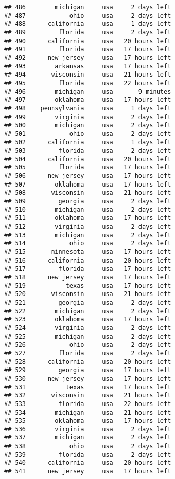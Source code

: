 \documentclass[
]{article}
\begin{document}
\begin{verbatim}
## 486        michigan     usa     2 days left
## 487            ohio     usa     2 days left
## 488      california     usa     1 days left
## 489         florida     usa     2 days left
## 490      california     usa   20 hours left
## 491         florida     usa   17 hours left
## 492      new jersey     usa   17 hours left
## 493        arkansas     usa   17 hours left
## 494       wisconsin     usa   21 hours left
## 495         florida     usa   22 hours left
## 496        michigan     usa       9 minutes
## 497        oklahoma     usa   17 hours left
## 498    pennsylvania     usa     1 days left
## 499        virginia     usa     2 days left
## 500        michigan     usa     2 days left
## 501            ohio     usa     2 days left
## 502      california     usa     1 days left
## 503         florida     usa     2 days left
## 504      california     usa   20 hours left
## 505         florida     usa   17 hours left
## 506      new jersey     usa   17 hours left
## 507        oklahoma     usa   17 hours left
## 508       wisconsin     usa   21 hours left
## 509         georgia     usa     2 days left
## 510        michigan     usa     2 days left
## 511        oklahoma     usa   17 hours left
## 512        virginia     usa     2 days left
## 513        michigan     usa     2 days left
## 514            ohio     usa     2 days left
## 515       minnesota     usa   17 hours left
## 516      california     usa   20 hours left
## 517         florida     usa   17 hours left
## 518      new jersey     usa   17 hours left
## 519           texas     usa   17 hours left
## 520       wisconsin     usa   21 hours left
## 521         georgia     usa     2 days left
## 522        michigan     usa     2 days left
## 523        oklahoma     usa   17 hours left
## 524        virginia     usa     2 days left
## 525        michigan     usa     2 days left
## 526            ohio     usa     2 days left
## 527         florida     usa     2 days left
## 528      california     usa   20 hours left
## 529         georgia     usa   17 hours left
## 530      new jersey     usa   17 hours left
## 531           texas     usa   17 hours left
## 532       wisconsin     usa   21 hours left
## 533         florida     usa   22 hours left
## 534        michigan     usa   21 hours left
## 535        oklahoma     usa   17 hours left
## 536        virginia     usa     2 days left
## 537        michigan     usa     2 days left
## 538            ohio     usa     2 days left
## 539         florida     usa     2 days left
## 540      california     usa   20 hours left
## 541      new jersey     usa   17 hours left

\end{verbatim}
\end{document}
